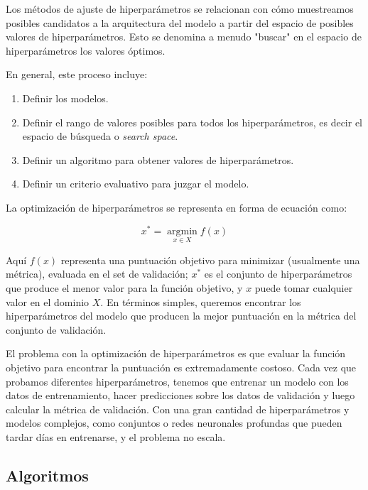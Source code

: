 \documentclass[a4paper,12pt]{article}
\begin{document}
Los métodos de ajuste de hiperparámetros se relacionan con cómo muestreamos posibles candidatos a la arquitectura del modelo a partir del espacio de posibles valores de hiperparámetros. Esto se denomina a menudo "buscar" en el espacio de hiperparámetros los valores óptimos.

En general, este proceso incluye:

\begin{enumerate}[noitemsep, topsep=2pt]
	\item Definir los modelos.
	\item Definir el rango de valores posibles para todos los hiperparámetros, es decir el espacio de búsqueda o \textit{search space}.
	\item Definir un algoritmo para obtener valores de hiperparámetros.
	\item Definir un criterio evaluativo para juzgar el modelo.
\end{enumerate}

La optimización de hiperparámetros se representa en forma de ecuación como:

$$x^* = \operatorname*{argmin}_{x \in X} f(x)$$

Aquí $f(x)$ representa una puntuación objetivo para minimizar (usualmente una métrica), evaluada en el set de validación; $x^*$ es el conjunto de hiperparámetros que produce el menor valor para la función objetivo, y $x$ puede tomar cualquier valor en el dominio $X$. En términos simples, queremos encontrar los hiperparámetros del modelo que producen la mejor puntuación en la métrica del conjunto de validación.

El problema con la optimización de hiperparámetros es que evaluar la función objetivo para encontrar la puntuación es extremadamente costoso. Cada vez que probamos diferentes hiperparámetros, tenemos que entrenar un modelo con los datos de entrenamiento, hacer predicciones sobre los datos de validación y luego calcular la métrica de validación. Con una gran cantidad de hiperparámetros y modelos complejos, como conjuntos o redes neuronales profundas que pueden tardar días en entrenarse, y el problema no escala.

\subsection{Algoritmos} \label{algo-hp}
\end{document}
